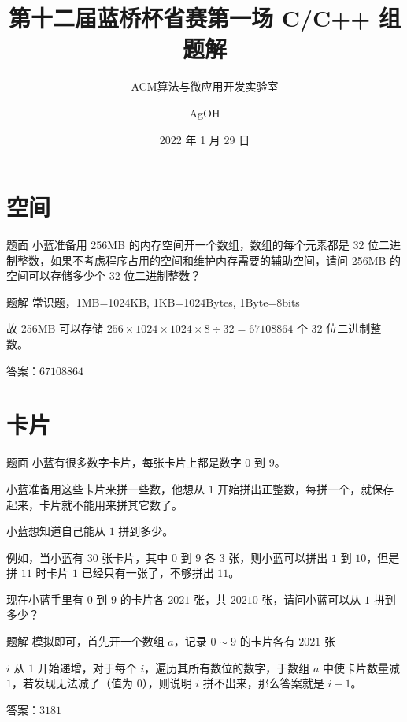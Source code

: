 \documentclass{pptt}
\title{第十二届蓝桥杯省赛第一场 C/C++ 组题解}
\author{ACM算法与微应用开发实验室 \and AgOH}
\date{2022 年 1 月 29 日}
\begin{document}
\maketitle

\section{空间}

\begin{frame}{题面}
    小蓝准备用 256MB 的内存空间开一个数组，数组的每个元素都是 32 位二进制整数，如果不考虑程序占用的空间和维护内存需要的辅助空间，请问 256MB 的空间可以存储多少个 32 位二进制整数？
\end{frame}

\begin{frame}{题解}
    常识题，1MB=1024KB, 1KB=1024Bytes, 1Byte=8bits

    故 256MB 可以存储 $256 \times 1024 \times 1024 \times 8 \div 32=67108864$ 个 32 位二进制整数。

    答案：$67108864$
\end{frame}

\section{卡片}

\begin{frame}{题面}
    小蓝有很多数字卡片，每张卡片上都是数字 $0$ 到 $9$。

    小蓝准备用这些卡片来拼一些数，他想从 $1$ 开始拼出正整数，每拼一个，就保存起来，卡片就不能用来拼其它数了。

    小蓝想知道自己能从 $1$ 拼到多少。

    例如，当小蓝有 $30$ 张卡片，其中 $0$ 到 $9$ 各 $3$ 张，则小蓝可以拼出 $1$ 到 $10$，但是拼 $11$ 时卡片 $1$ 已经只有一张了，不够拼出 $11$。

    现在小蓝手里有 $0$ 到 $9$ 的卡片各 $2021$ 张，共 $20210$ 张，请问小蓝可以从 $1$ 拼到多少？
\end{frame}

\begin{frame}{题解}
    模拟即可，首先开一个数组 $a$，记录 $0 \sim 9$ 的卡片各有 $2021$ 张

    $i$ 从 $1$ 开始递增，对于每个 $i$，遍历其所有数位的数字，于数组 $a$ 中使卡片数量减 $1$，若发现无法减了（值为 $0$），则说明 $i$ 拼不出来，那么答案就是 $i-1$。

    答案：$3181$
\end{frame}
\end{document}
